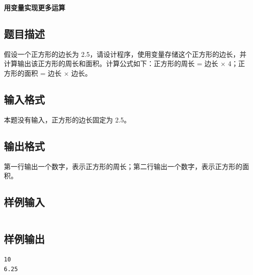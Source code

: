 \documentclass{article}
\newcommand{\problemname}[1]{\begin{center}\Large\bfseries #1\end{center}}
\begin{document}
\problemname{用变量实现更多运算}

\subsection*{题目描述}
假设一个正方形的边长为 2.5，请设计程序，使用变量存储这个正方形的边长，并计算输出该正方形的周长和面积。计算公式如下：正方形的周长 = 边长 × 4；正方形的面积 = 边长 × 边长。

\subsection*{输入格式}
本题没有输入，正方形的边长固定为 2.5。

\subsection*{输出格式}
第一行输出一个数字，表示正方形的周长；第二行输出一个数字，表示正方形的面积。

\subsection*{样例输入}
\begin{verbatim}

\end{verbatim}

\subsection*{样例输出}
\begin{verbatim}
10
6.25
\end{verbatim}
\end{document}

